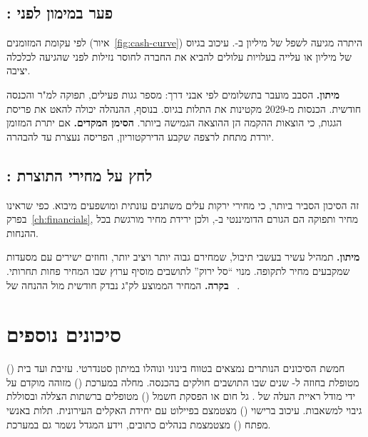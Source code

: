 \subsection{\texorpdfstring{}{R8}: פער במימון לפני \texorpdfstring{}{Series A}}

לפי עקומת המזומנים (איור~\ref{fig:cash-curve}) היתרה מגיעה לשפל של \RRminCash{} מיליון \shekel{} ב-\RRminCashYear{}. עיכוב בגיוס  של \RRseriesA{} מיליון \shekel{} או עלייה בעלויות עלולים להביא את החברה לחוסר נזילות לפני שהגיעה לכלכלה יציבה.

\begin{riskbox}
\textbf{מיתון.} הסבב מועבר בתשלומים לפי אבני דרך: מספר גגות פעילים, תפוקה למ"ר והכנסה חודשית. הכנסות  מ-2029 מקטינות את התלות בגיוס. בנוסף, ההנהלה יכולה להאט את פריסת הגגות, כי הוצאות ההקמה הן ההוצאה הגמישה ביותר. \textbf{הסימן המקדים.} אם יתרת המזומן יורדת מתחת לרצפה שקבע הדירקטוריון, הפריסה נעצרת עד להבהרה.
\end{riskbox}

\subsection{\texorpdfstring{}{R3}: לחץ על מחירי התוצרת}

זה הסיכון הסביר ביותר, כי מחירי ירקות עלים משתנים עונתית ומושפעים מיבוא. כפי שראינו בפרק~\ref{ch:financials}, מחיר ותפוקה הם הגורם הדומיננטי ב-, ולכן ירידת מחיר מורגשת בכל ההנחות.

\begin{riskbox}
\textbf{מיתון.} תמהיל עשיר בעשבי תיבול, שמחירם גבוה יותר ויציב יותר, וחוזים ישירים עם מסעדות שמקבעים מחיר לתקופה. מנוי \enquote{סל ירוק} לתושבים מוסיף ערוץ שבו המחיר פחות תחרותי. \textbf{בקרה.} המחיר הממוצע לק"ג נבדק חודשית מול ההנחה של \RRprice~\shekel.
\end{riskbox}

\section{סיכונים נוספים}

חמשת הסיכונים הנותרים נמצאים בטווח בינוני ונוהלו במיתון סטנדרטי. עזיבת ועד בית () מטופלת בחוזה ל-\RRcontractYears{} שנים שבו התושבים חולקים בהכנסה. מחלה במערכת () מזוהה מוקדם על ידי מודל ראיית העלה של . גל חום או הפסקת חשמל () מטופלים ברשתות הצללה ובסוללת גיבוי למשאבות. עיכוב ברישוי () מצטמצם בפיילוט עם יחידת האקלים העירונית. תלות באנשי מפתח () מצטמצמת בנהלים כתובים, וידע המגדל נשמר גם במערכת.

